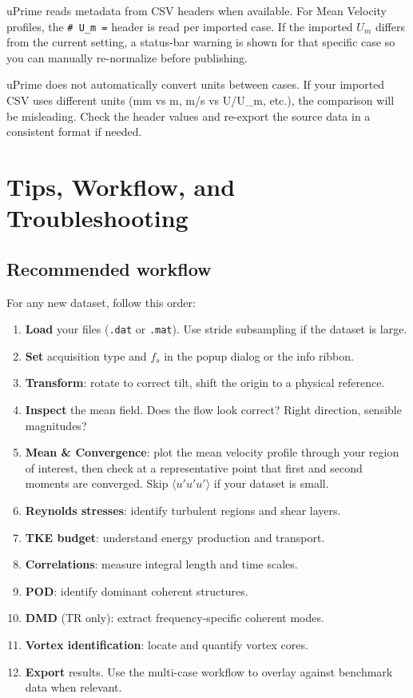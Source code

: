 \documentclass[11pt, a4paper]{report}
\newcommand{\software}[1]{\textsf{#1}}
\begin{document}
\software{uPrime} reads metadata from CSV headers when available. For Mean Velocity profiles, the \texttt{\# U\_m =} header is read per imported case. If the imported $U_m$ differs from the current setting, a status-bar warning is shown for that specific case so you can manually re-normalize before publishing.

\begin{warnbox}
\software{uPrime} does not automatically convert units between cases. If your imported CSV uses different units (mm vs m, m/s vs U/U\_m, etc.), the comparison will be misleading. Check the header values and re-export the source data in a consistent format if needed.
\end{warnbox}

\chapter{Tips, Workflow, and Troubleshooting}

\section{Recommended workflow}

For any new dataset, follow this order:

\begin{enumerate}[leftmargin=1.5em]
  \item \textbf{Load} your files (\texttt{.dat} or \texttt{.mat}). Use stride subsampling if the dataset is large.
  \item \textbf{Set} acquisition type and $f_s$ in the popup dialog or the info ribbon.
  \item \textbf{Transform}: rotate to correct tilt, shift the origin to a physical reference.
  \item \textbf{Inspect} the mean field. Does the flow look correct? Right direction, sensible magnitudes?
  \item \textbf{Mean \& Convergence}: plot the mean velocity profile through your region of interest, then check at a representative point that first and second moments are converged. Skip $\langle u'u'u' \rangle$ if your dataset is small.
  \item \textbf{Reynolds stresses}: identify turbulent regions and shear layers.
  \item \textbf{TKE budget}: understand energy production and transport.
  \item \textbf{Correlations}: measure integral length and time scales.
  \item \textbf{POD}: identify dominant coherent structures.
  \item \textbf{DMD} (TR only): extract frequency-specific coherent modes.
  \item \textbf{Vortex identification}: locate and quantify vortex cores.
  \item \textbf{Export} results. Use the multi-case workflow to overlay against benchmark data when relevant.
\end{enumerate}
\end{document}
